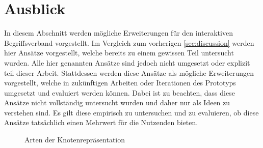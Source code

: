 \section{Ausblick}\label{sec:outlook}
In diesem Abschnitt werden mögliche Erweiterungen für den interaktiven Begriffsverband vorgestellt.
Im Vergleich zum vorherigen \autoref{sec:discussion} werden hier Ansätze vorgestellt, welche bereits zu einem gewissen Teil untersucht wurden.
Alle hier genannten Ansätze sind jedoch nicht umgesetzt oder explizit teil dieser Arbeit.
Stattdessen werden diese Ansätze als mögliche Erweiterungen vorgestellt, welche in zukünftigen Arbeiten oder Iterationen des Prototyps umgesetzt und evaluiert werden können.
Dabei ist zu beachten, dass diese Ansätze nicht vollständig untersucht wurden und daher nur als Ideen zu verstehen sind.
Es gilt diese empirisch zu untersuchen und zu evaluieren, ob diese Ansätze tatsächlich einen Mehrwert für die Nutzenden bieten. \\

\begin{figure}[!ht]
    \centering
    \caption{\label{fig:node-types}Arten der Knotenrepräsentation}
\end{figure}

